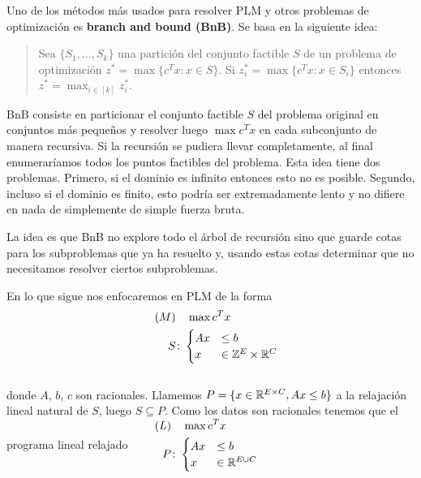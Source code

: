 Uno de los métodos más usados para resolver PLM y otros problemas de optimización es \textbf{branch and bound (BnB)}. Se basa en la siguiente idea: 

\begin{quote}
Sea $\{S_1,\dots, S_k\}$ una partición del conjunto factible $S$ de un problema de optimización $z^*=\max \{c^Tx\colon x\in S\}$.
    Si $z^*_i=\max\{c^Tx\colon x\in S_i\}$ entonces $z^*=\max_{i\in [k]}z^*_i.$
\end{quote}

    BnB consiste en particionar el conjunto factible $S$ del problema original en conjuntos más pequeños y resolver luego $\max c^Tx$ en cada subconjunto de manera recursiva. Si la recursión se pudiera llevar completamente, al final  enumeraríamos todos los puntos factibles del problema. Esta idea tiene dos problemas. Primero, si el dominio es infinito entonces esto no es posible. Segundo, incluso si el dominio es finito, esto podría ser extremadamente lento y no difiere en nada de simplemente de simple fuerza bruta. 

    La idea es que BnB no explore todo el árbol de recursión sino que guarde cotas para los subproblemas que ya ha resuelto y, usando estas cotas determinar que no necesitamos resolver ciertos subproblemas. 
    
    En lo que sigue nos enfocaremos en PLM de la forma    
$$\begin{aligned}
    \qquad (M)&\quad \max c^Tx\\
    S&\colon \begin{cases}
    Ax &\leq b\\
    x&\in \mathbb Z^E\times \mathbb R^C
    \end{cases}\quad
    \end{aligned}$$\\[5pt]
    donde $A$, $b$, $c$ son racionales. Llamemos $P=\{x\in \mathbb R^{E\times C}, Ax\leq b\}$ a la relajación lineal natural de $S$, luego $S \subseteq P.$  Como los datos son racionales tenemos que el programa lineal relajado 
    $\begin{aligned}
        \qquad (L)&\quad \max c^Tx\\
        P&\colon \begin{cases}
        Ax &\leq b\\
        x&\in \mathbb R^{E\cup C}
        \end{cases}\quad
        \end{aligned}$\\[5pt]
        
